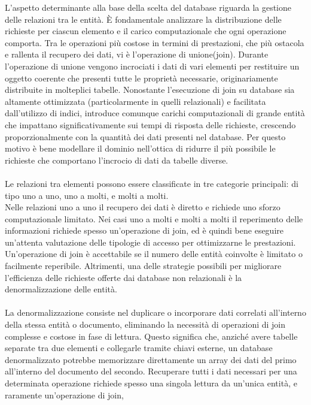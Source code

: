L'aspetto determinante alla base della scelta del database 
riguarda la gestione delle relazioni tra le entità. 
È fondamentale analizzare la distribuzione delle richieste per ciascun elemento
e il carico computazionale che ogni operazione comporta. 
Tra le operazioni più costose in termini di prestazioni, 
che più ostacola e rallenta il recupero dei dati, vi è l'operazione di unione(join). 
Durante l'operazione di unione vengono incrociati i dati di vari elementi 
per restituire un oggetto coerente che presenti tutte le proprietà necessarie, 
originariamente distribuite in molteplici tabelle. 
Nonostante l'esecuzione di join su database sia altamente ottimizzata
(particolarmente in quelli relazionali) e facilitata dall'utilizzo di indici,
introduce comunque carichi computazionali di grande entità che impattano
significativamente sui tempi di risposta delle richieste, 
crescendo proporzionalmente con la quantità dei dati presenti nel database. 
Per questo motivo è bene modellare il dominio nell'ottica di ridurre il più possibile 
le richieste che comportano l'incrocio di dati da tabelle diverse.\\
\\
Le relazioni tra elementi possono essere classificate in tre categorie principali: 
di tipo uno a uno, uno a molti, e molti a molti. \\
Nelle relazioni uno a uno il recupero dei dati è diretto 
e richiede uno sforzo computazionale limitato. 
Nei casi uno a molti e molti a molti il reperimento delle informazioni richiede 
spesso un'operazione di join, ed è quindi bene eseguire un'attenta valutazione 
delle tipologie di accesso per ottimizzarne le prestazioni.
Un'operazione di join è accettabile se il numero delle entità coinvolte è limitato o facilmente reperibile.
Altrimenti, una delle strategie possibili per migliorare l’efficienza delle richieste 
offerte dai database non relazionali è la denormalizzazione delle entità.\\
\\
La denormalizzazione consiste nel duplicare o incorporare dati correlati all'interno della stessa entità o documento, 
eliminando la necessità di operazioni di join complesse e costose in fase di lettura. 
Questo significa che, anziché avere tabelle separate tra due elementi e collegarle tramite chiavi esterne, 
un database denormalizzato potrebbe memorizzare direttamente 
un array dei dati del primo all'interno del documento del secondo.
Recuperare tutti i dati necessari per una determinata operazione richiede spesso 
una singola lettura da un'unica entità, e raramente un'operazione di join,
